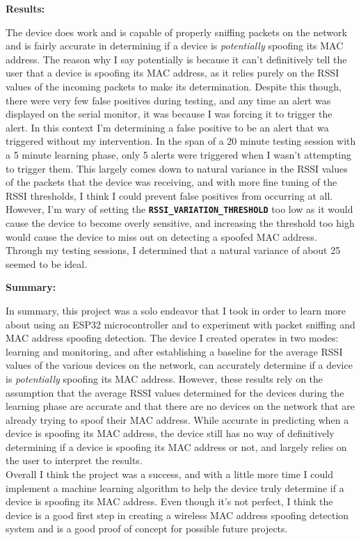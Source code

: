 \documentclass[letterpaper, 11pt]{article}
\newcommand{\secHeader}[1]{\vspace{2mm} \noindent \textbf{#1:}\vspace{-4mm}}
\begin{document}
\secHeader{Results}
\vspace{5mm}

The device does work and is capable of properly sniffing packets on the network and is fairly accurate in determining if a device is \textit{potentially} spoofing its MAC address. The reason why
I say potentially is because it can't definitively tell the user that a device is spoofing its MAC address, as it relies purely on the RSSI values of the incoming packets to make its determination. 
Despite this though, there were very few false positives during testing, and any time an alert was displayed on the serial monitor, it was because I was forcing it to trigger the alert. In this context
I'm determining a false positive to be an alert that wa triggered without my intervention. In the span of a 20 minute testing session with a 5 minute learning phase, only 5 alerts were triggered
when I wasn't attempting to trigger them. This largely comes down to natural variance in the RSSI values of the packets that the device was receiving, and with more fine tuning of the RSSI thresholds,
I think I could prevent false positives from occurring at all. However, I'm wary of setting the \textbf{\lstinline[]|RSSI_VARIATION_THRESHOLD|} too low as it would cause the device to become overly
sensitive, and increasing the threshold too high would cause the device to miss out on detecting a spoofed MAC address.
Through my testing sessions, I determined that a natural variance of about 25 seemed to be ideal.

\newpage 
\secHeader{Summary}
\vspace{5mm}

\indent In summary, this project was a solo endeavor that I took in order to learn more about using an ESP32 microcontroller and to experiment with packet sniffing and MAC address spoofing detection.
The device I created operates in two modes: learning and monitoring, and after establishing a baseline for the average RSSI values of the various devices on the network, can accurately determine if a 
device is \textit{potentially} spoofing its MAC address. However, these results rely on the assumption that the average RSSI values determined for the devices during the learning phase are accurate
and that there are no devices on the network that are already trying to spoof their MAC address. While accurate in predicting when a device is spoofing its MAC address, the device still has no way of
definitively determining if a device is spoofing its MAC address or not, and largely relies on the user to interpret the results. 
\\\indent Overall I think the project was a success, and with a little more time I could implement a machine learning algorithm to help the device truly determine if a device is spoofing its MAC address.
Even though it's not perfect, I think the device is a good first step in creating a wireless MAC address spoofing detection system and is a good proof of concept for possible future projects.
\end{document}
